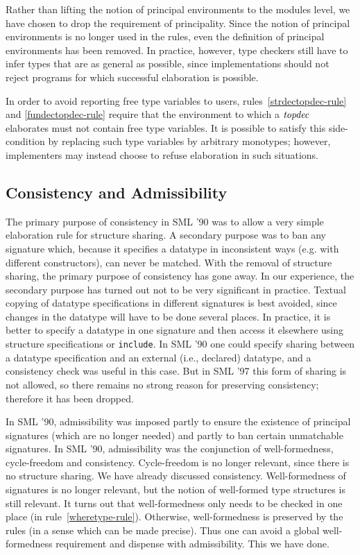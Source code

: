 Rather than lifting the notion of principal environments to the
modules level, we have chosen to drop the requirement of principality.
Since the notion of principal environments is no longer used in the
rules, even the definition of principal environments has been removed.
In practice, however, type checkers still have to infer types that
are as general as possible, since implementations should not reject
programs for which successful elaboration is possible.


In order to avoid reporting free type variables to users,
rules~\ref{strdectopdec-rule} and \ref{fundectopdec-rule} 
require that the environment
to which a ${\it topdec}$ elaborates must not contain free type
variables. It is possible to satisfy this side-condition 
by replacing such type variables by arbitrary 
monotypes; however, implementers may instead choose to 
refuse elaboration in such situations.

\subsection{Consistency and Admissibility}
The primary purpose of consistency in SML '90 was to allow
a very simple elaboration rule for structure sharing. A secondary
purpose was to ban any signature which, because it specifies a datatype in
inconsistent ways (e.g. with different constructors), can never
be matched.
 With the removal of structure sharing,
the primary purpose of consistency has gone away. In our experience,
the secondary purpose has turned out not to be very significant
in practice. Textual copying of datatype specifications in different signatures
is best avoided, since changes in the datatype will have to be
done several places. In practice, it is better to specify a datatype in
one signature and then access it elsewhere using structure specifications
or {\tt include}. In SML '90 one could specify sharing between a
datatype specification and an external (i.e., declared) datatype, and
a consistency check was useful in this case.
But in SML '97
       this form of sharing is not allowed, so there remains no strong 
       reason for preserving consistency; therefore it has been dropped.

In SML '90, admissibility was imposed partly to ensure the existence
of principal signatures (which are no longer needed) and partly
to ban certain unmatchable signatures. In SML '90, admissibility was
the conjunction of well-formedness, cycle-freedom and consistency.
Cycle-freedom is no longer relevant, since there is no structure sharing.
We have already discussed consistency. Well-formedness of signatures
is no longer relevant, but the notion of well-formed type structures
is still relevant. It turns out that well-formedness only needs to be
checked in one place (in rule~\ref{wheretype-rule}). Otherwise, 
well-formedness is preserved by the rules (in a sense which can be
made precise). Thus one can avoid a global well-formedness requirement
and dispense with admissibility. This we have done.

